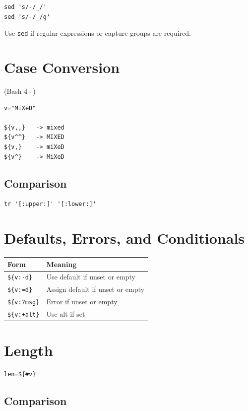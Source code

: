 \documentclass[11pt]{article}
\begin{document}
\begin{lstlisting}
sed 's/-/_/'
sed 's/-/_/g'
\end{lstlisting}

Use \texttt{sed} if regular expressions or capture groups are required.

\section{Case Conversion}

(Bash 4+)

\begin{lstlisting}
v="MiXeD"

${v,,}   -> mixed
${v^^}   -> MIXED
${v,}    -> miXeD
${v^}    -> MiXeD
\end{lstlisting}

\subsection{Comparison}

\begin{lstlisting}
tr '[:upper:]' '[:lower:]'
\end{lstlisting}

\section{Defaults, Errors, and Conditionals}

\begin{longtable}{ll}
\toprule
Form & Meaning \\
\midrule
\texttt{\$\{v:-d\}} & Use default if unset or empty \\
\texttt{\$\{v:=d\}} & Assign default if unset or empty \\
\texttt{\$\{v:?msg\}} & Error if unset or empty \\
\texttt{\$\{v:+alt\}} & Use alt if set \\
\bottomrule
\end{longtable}

\section{Length}

\begin{lstlisting}
len=${#v}
\end{lstlisting}

\subsection{Comparison}
\end{document}
